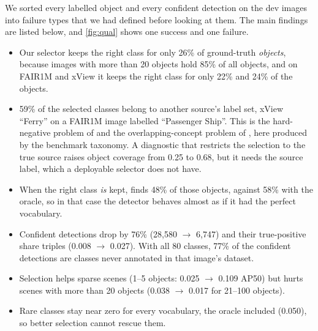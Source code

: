 We sorted every labelled object and every confident detection on the dev images into failure types that we had defined before looking at them.
The main findings are listed below, and \cref{fig:qual} shows one success and one failure.
\begin{itemize}
  \item Our selector keeps the right class for only 26\% of ground-truth \emph{objects}, because images with more than 20 objects hold 85\% of all objects, and on FAIR1M and xView it keeps the right class for only 22\% and 24\% of the objects.
  \item 59\% of the selected classes belong to another source's label set, \eg xView ``Ferry'' on a FAIR1M image labelled ``Passenger Ship''. This is the hard-negative problem of \cite{bianchi2024devil} and the overlapping-concept problem of \cite{li2024lbp}, here produced by the benchmark taxonomy. A diagnostic that restricts the selection to the true source raises object coverage from 0.25 to 0.68, but it needs the source label, which a deployable selector does not have.
  \item When the right class \emph{is} kept, \gdino finds 48\% of those objects, against 58\% with the oracle, so in that case the detector behaves almost as if it had the perfect vocabulary.
  \item Confident detections drop by 76\% (28,580 $\rightarrow$ 6,747) and their true-positive share triples (0.008 $\rightarrow$ 0.027). With all 80 classes, 77\% of the confident detections are classes never annotated in that image's dataset.
  \item Selection helps sparse scenes (1--5 objects: 0.025 $\rightarrow$ 0.109 AP50) but hurts scenes with more than 20 objects (0.038 $\rightarrow$ 0.017 for 21--100 objects).
  \item Rare classes stay near zero for every vocabulary, the oracle included (0.050), so better selection cannot rescue them.
\end{itemize}
